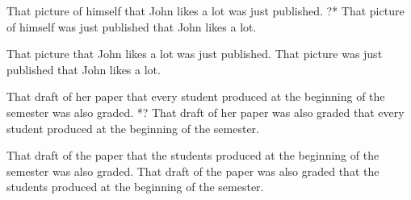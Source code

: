 \begin{exe}
                  
    \ex \begin{xlist}
         \ex \label{prinAsitu} That picture of himself that John likes a lot was just published.
         \ex \label{prinAex} ?* That picture of himself was just published that John likes a lot.
                  \end{xlist}
                  
              
   \ex \label{control1} \begin{xlist}
         \ex \label{controlAsitu} That picture that John likes a lot was just published.
         \ex \label{controlAex} That picture was just published that John likes a lot.
                  \end{xlist}
         
 
  
  \ex \begin{xlist}
        \ex \label{boundVarSitu} That draft of her paper that every student produced at the beginning of the semester was also graded.
         \ex \label{boundVarEx} *? That draft of her paper was also graded that every student produced at the beginning of the semester.
 \end{xlist}    
 
\ex  \label{control2} \begin{xlist}
        \ex \label{controlSitu} That draft of the paper that the students produced at the beginning of the semester was also graded.
       \ex \label{controlEx} That draft of the paper was also graded that the students produced at the beginning of the semester.


\end{xlist}
\end{exe}
